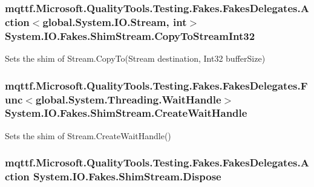 \hypertarget{class_system_1_1_i_o_1_1_fakes_1_1_shim_stream_af7e13a283a2c86dae8721867c05f0595}{
\subsubsection[{Copy\-To\-Stream\-Int32}]{\setlength{\rightskip}{0pt plus 5cm}mqttf.\-Microsoft.\-Quality\-Tools.\-Testing.\-Fakes.\-Fakes\-Delegates.\-Action$<$global.\-System.\-I\-O.\-Stream, int$>$ System.\-I\-O.\-Fakes.\-Shim\-Stream.\-Copy\-To\-Stream\-Int32\hspace{0.3cm}{\ttfamily [set]}}}\label{class_system_1_1_i_o_1_1_fakes_1_1_shim_stream_af7e13a283a2c86dae8721867c05f0595}


Sets the shim of Stream.\-Copy\-To(\-Stream destination, Int32 buffer\-Size)

\hypertarget{class_system_1_1_i_o_1_1_fakes_1_1_shim_stream_a88090cfa304353328bb52d63eb81612b}{
\subsubsection[{Create\-Wait\-Handle}]{\setlength{\rightskip}{0pt plus 5cm}mqttf.\-Microsoft.\-Quality\-Tools.\-Testing.\-Fakes.\-Fakes\-Delegates.\-Func$<$global.\-System.\-Threading.\-Wait\-Handle$>$ System.\-I\-O.\-Fakes.\-Shim\-Stream.\-Create\-Wait\-Handle\hspace{0.3cm}{\ttfamily [set]}}}\label{class_system_1_1_i_o_1_1_fakes_1_1_shim_stream_a88090cfa304353328bb52d63eb81612b}


Sets the shim of Stream.\-Create\-Wait\-Handle()

\hypertarget{class_system_1_1_i_o_1_1_fakes_1_1_shim_stream_a05c348a628984b846494a4225f3698a7}{
\subsubsection[{Dispose}]{\setlength{\rightskip}{0pt plus 5cm}mqttf.\-Microsoft.\-Quality\-Tools.\-Testing.\-Fakes.\-Fakes\-Delegates.\-Action System.\-I\-O.\-Fakes.\-Shim\-Stream.\-Dispose\hspace{0.3cm}{\ttfamily [set]}}}\label{class_system_1_1_i_o_1_1_fakes_1_1_shim_stream_a05c348a628984b846494a4225f3698a7}


